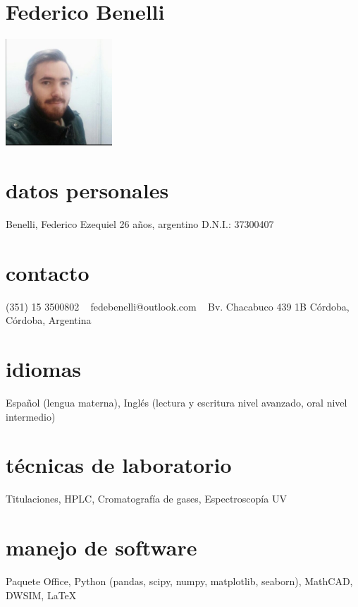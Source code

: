 \documentclass[espanol]{cv-style}     %
\begin{document}
\lastupdated

\begin{aside}
\section{Federico Benelli}
\includegraphics[width=4cm]{ppic.jpg}
%
\section{datos personales}
Benelli, Federico Ezequiel
26 años, argentino
D.N.I.: 37300407
%
\section{contacto}
(351) 15 3500802
~
fedebenelli@outlook.com
~
Bv. Chacabuco 439 1B
Córdoba, Córdoba, Argentina
%
\section{idiomas}
Español (lengua materna),
Inglés (lectura y escritura nivel avanzado, oral nivel intermedio)
%
\section{técnicas de laboratorio}
Titulaciones,
HPLC,
Cromatografía de gases,
Espectroscopía UV
\section{manejo de software}
Paquete Office, 
Python (pandas, scipy, numpy, matplotlib, seaborn),
MathCAD,
DWSIM,
\LaTeX
%
\end{aside}

\vspace{0.2cm}
\end{document}
